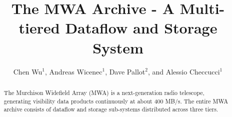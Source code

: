 \documentclass[11pt,twoside]{article}
\begin{document}
\title{The MWA Archive - A Multi-tiered Dataflow and Storage System}
\author{Chen Wu$^1$, Andreas Wicenec$^1$, Dave Pallot$^2$, and Alessio Checcucci$^1$
}

\begin{abstract}
The Murchison Widefield Array (MWA) is a next-generation radio telescope, generating visibility data products continuously at about 400 MB/s. The entire MWA archive consists of dataflow and storage sub-systems distributed across three tiers. %
\end{abstract}

\end{document}
